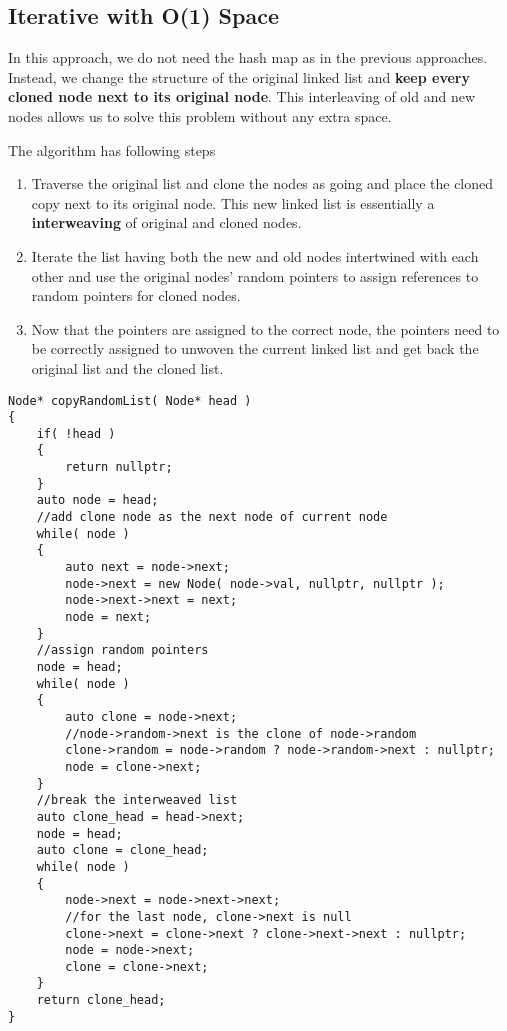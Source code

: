 \subsection{Iterative with O(1) Space}
In this approach, we do not need the hash map as in the previous approaches. Instead, we change the structure of the original linked list and \textbf{keep every cloned node next to its original node}. This interleaving of old and new nodes allows us to solve this problem without any extra space. 
\par
The algorithm has following steps
\begin{enumerate}
    \item Traverse the original list and clone the nodes as going and place the cloned copy next to its original node. This new linked list is essentially a \textbf{interweaving} of original and cloned nodes.
    \item Iterate the list having both the new and old nodes intertwined with each other and use the original nodes' random pointers to assign references to random pointers for cloned nodes. 
    \item Now that the  pointers are assigned to the correct node, the  pointers need to be correctly assigned to unwoven the current linked list and get back the original list and the cloned list. 
\end{enumerate}

\begin{lstlisting}[style=customc, caption={Constant Space}]
Node* copyRandomList( Node* head )
{
    if( !head )
    {
        return nullptr;
    }
    auto node = head;
    //add clone node as the next node of current node
    while( node )
    {
        auto next = node->next;
        node->next = new Node( node->val, nullptr, nullptr );
        node->next->next = next;
        node = next;
    }
    //assign random pointers
    node = head;
    while( node )
    {
        auto clone = node->next;
        //node->random->next is the clone of node->random
        clone->random = node->random ? node->random->next : nullptr;
        node = clone->next;
    }
    //break the interweaved list
    auto clone_head = head->next;
    node = head;
    auto clone = clone_head;
    while( node )
    {
        node->next = node->next->next;
        //for the last node, clone->next is null
        clone->next = clone->next ? clone->next->next : nullptr;
        node = node->next;
        clone = clone->next;
    }
    return clone_head;
}
\end{lstlisting}